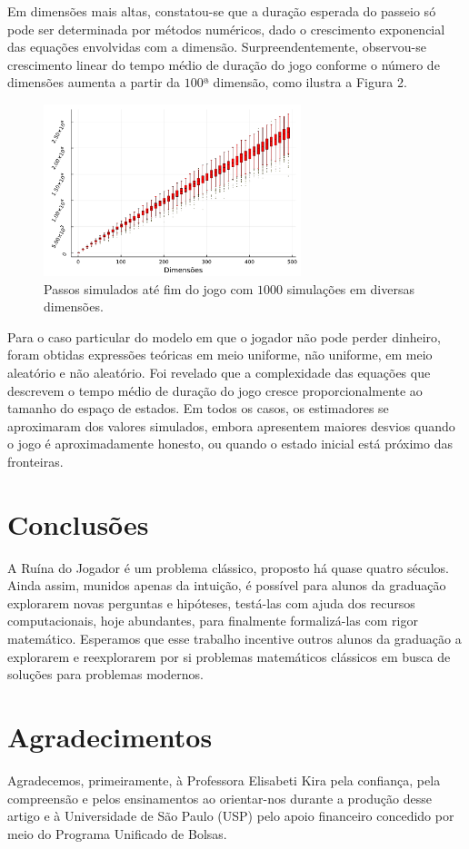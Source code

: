 \documentclass[a4paper,10pt,twocolumn]{article}
\begin{document}
Em dimensões mais altas, constatou-se que a duração esperada do
passeio só pode ser determinada por métodos numéricos, dado o crescimento exponencial das
equações envolvidas com a dimensão. Surpreendentemente, observou-se crescimento linear
do tempo médio de duração do jogo conforme o número de dimensões aumenta a partir da 
$100$ª dimensão, como ilustra a Figura 2.

\begin{figure}[h]
    \caption{Passos simulados até fim do jogo com $1000$ simulações em diversas
    dimensões.}
    \centering
    \includegraphics[width=7.5cm]{"boxplots.pdf"}
\end{figure}

Para o caso particular do modelo em que o jogador não pode perder
dinheiro, foram obtidas expressões teóricas em meio uniforme, não uniforme, em
meio aleatório e não aleatório. Foi revelado que a complexidade das equações que 
descrevem o tempo médio de duração do jogo cresce proporcionalmente ao tamanho
do espaço de estados. Em todos os casos, os estimadores se aproximaram dos valores
simulados, embora apresentem maiores desvios quando o jogo é aproximadamente
honesto, ou quando o estado inicial está próximo das fronteiras.

\section{Conclusões}

A Ruína do Jogador é um problema clássico, proposto há quase quatro séculos. 
Ainda assim, munidos apenas da intuição, é possível para alunos da graduação
explorarem novas perguntas e hipóteses, testá-las com ajuda dos recursos
computacionais, hoje abundantes, para finalmente formalizá-las com rigor
matemático. Esperamos que esse trabalho incentive outros alunos da graduação a
explorarem e reexplorarem por si problemas matemáticos clássicos em busca de
soluções para problemas modernos.

\section{Agradecimentos}

Agradecemos, primeiramente, à Professora Elisabeti Kira pela confiança, pela
compreensão e pelos ensinamentos ao orientar-nos durante a produção desse artigo
e à Universidade de São Paulo (USP) pelo apoio financeiro concedido por meio do
Programa Unificado de Bolsas.

\vspace{0.5cm}


\end{document}
